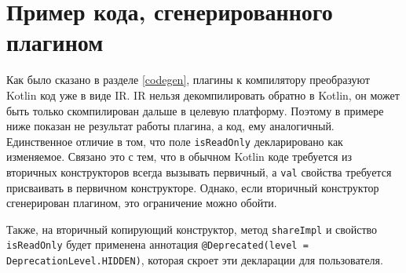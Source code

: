 \documentclass[specification,annotation,times]{itmo-student-thesis}
\begin{document}
\printmainbibliography

\appendix

\chapter{Пример кода, сгенерированного плагином}\label{share_gen_example}

Как было сказано в разделе \ref{codegen}, плагины к компилятору преобразуют
Kotlin код уже в виде IR. IR нельзя
декомпилировать обратно в Kotlin, он может быть только скомпилирован
дальше в целевую платформу.
Поэтому в примере ниже показан не результат работы плагина, а код, ему аналогичный.
Единственное отличие в том, что поле \texttt{isReadOnly} декларировано как изменяемое.
Связано это с тем, что в обычном Kotlin коде требуется из вторичных конструкторов всегда вызывать первичный, а \texttt{val} свойства требуется присваивать в первичном конструкторе.
Однако, если вторичный конструктор сгенерирован плагином, это ограничение можно обойти.

Также, на вторичный копирующий конструктор, метод \texttt{shareImpl} и свойство \texttt{isReadOnly} будет применена аннотация \texttt{@Deprecated(level = DeprecationLevel.HIDDEN)}, которая скроет эти декларации для пользователя.
\end{document}
